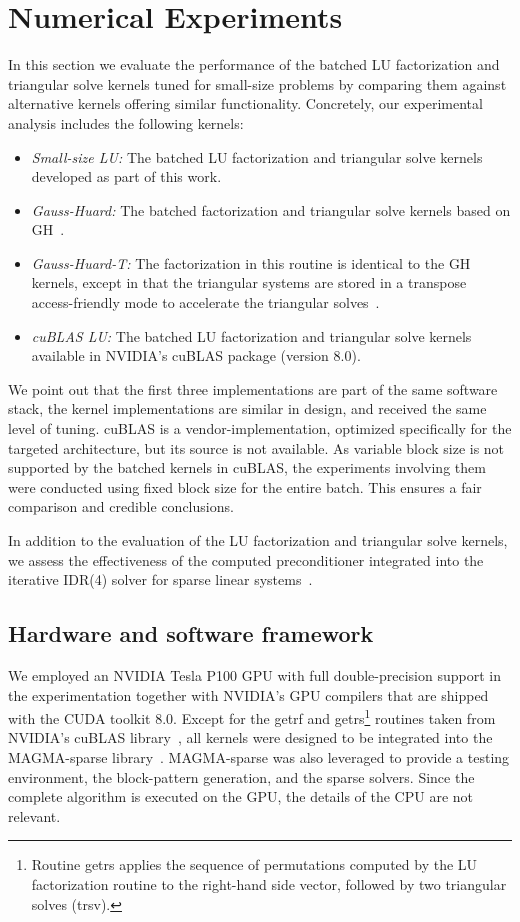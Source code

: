 \section{Numerical Experiments}
\label{2017-lu-block-jacobi:sec:experiments}

In this section we evaluate the performance of the batched LU factorization and triangular solve kernels tuned for small-size
problems
by comparing them
against alternative kernels offering similar functionality.
Concretely, our experimental analysis includes the following kernels:
\begin{itemize}
\item
\textit{Small-size LU:}
The batched LU factorization and triangular solve kernels developed as part of this work.
\item
\textit{Gauss-Huard:}
The batched factorization and triangular solve kernels based on GH~\cite{gh}.
\item
\textit{Gauss-Huard-T:}
The factorization in this routine is identical to the GH kernels, 
except in that the triangular systems are stored in a transpose access-friendly mode to
accelerate the triangular solves~\cite{gh}.
\item
\textit{cuBLAS LU:}
The batched LU factorization and triangular solve kernels available in NVIDIA's cuBLAS package (version 8.0).
\end{itemize}
We point out that the first three implementations
are part of the same software stack,
the kernel implementations are similar in design,
and received the same level of tuning.
cuBLAS is a vendor-implementation,
optimized specifically for the targeted architecture,
but its source is not available.
As variable block size is not supported by the batched kernels in cuBLAS,
the experiments involving them were conducted using
fixed block size for the entire batch.
This ensures a fair comparison and credible conclusions.

In addition to the evaluation of the LU factorization and triangular solve kernels, 
we assess the effectiveness of the computed preconditioner
integrated into the iterative IDR(4) solver for sparse linear systems~\cite{saad}.

\subsection{Hardware and software framework}
We employed an NVIDIA Tesla P100 GPU with full double-precision support in the experimentation
together with NVIDIA's GPU compilers that are shipped with the CUDA toolkit 8.0. 
Except for the {\sc getrf} and {\sc getrs}\footnote{Routine {\sc getrs} applies the sequence of permutations computed
by the LU factorization routine to the right-hand side vector, followed by two
triangular solves ({\sc trsv}).} 
routines taken from NVIDIA's cuBLAS library~\cite{cuda8.0}, 
all kernels
were designed to be integrated into the MAGMA-sparse library~\cite{magma}.
MAGMA-sparse was also leveraged to provide a testing environment, the block-pattern generation, and the sparse solvers.
Since the complete algorithm is executed on the GPU, the details of the CPU are
not relevant.

